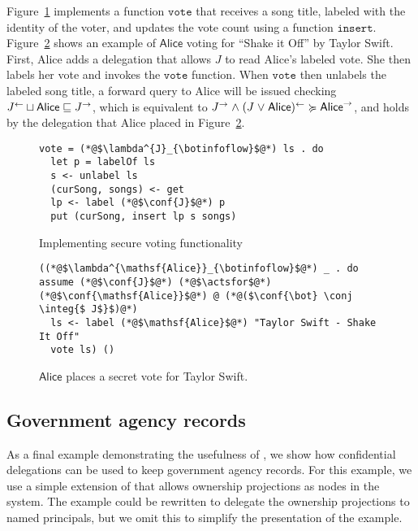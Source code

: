 Figure~\ref{fig:vote-for-song} implements a function $\mathtt{vote}$ that receives a song title, labeled with the identity of the voter, and updates the vote count using a function $\mathtt{insert}$. Figure~\ref{fig:jukebox-alice-votes-for-taylor-swift} shows an example of $\mathsf{Alice}$ voting for ``Shake it Off'' by Taylor Swift. First, Alice adds a delegation that allows $J$ to read Alice's labeled vote. She then labels her vote and invokes the $\mathtt{vote}$ function. When $\mathtt{vote}$ then unlabels the labeled song title, a forward query to Alice will be issued checking $J^{\leftarrow} \sqcup \mathsf{Alice} \sqsubseteq J^{\rightarrow}$, which is equivalent to $J^{\rightarrow} \mathrel{\land} (J \mathrel{\lor} \mathsf{Alice})^{\leftarrow} \succcurlyeq \mathsf{Alice}^{\rightarrow}$, and holds by the delegation that Alice placed in Figure~\ref{fig:jukebox-alice-votes-for-taylor-swift}.

\begin{figure}
\centering
\begin{lstlisting}
vote = (*@$\lambda^{J}_{\botinfoflow}$@*) ls . do
  let p = labelOf ls
  s <- unlabel ls
  (curSong, songs) <- get
  lp <- label (*@$\conf{J}$@*) p
  put (curSong, insert lp s songs)
\end{lstlisting}
\caption{Implementing secure voting functionality}
\label{fig:vote-for-song}
\end{figure}

\begin{figure}
\centering
\begin{lstlisting}
((*@$\lambda^{\mathsf{Alice}}_{\botinfoflow}$@*) _ . do assume (*@$\conf{J}$@*) (*@$\actsfor$@*) (*@$\conf{\mathsf{Alice}}$@*) @ (*@($\conf{\bot} \conj \integ{$ J$}$)@*)
  ls <- label (*@$\mathsf{Alice}$@*) "Taylor Swift - Shake It Off"
  vote ls) ()
\end{lstlisting}
\caption{$\mathsf{Alice}$ places a secret vote for Taylor Swift.}
\label{fig:jukebox-alice-votes-for-taylor-swift}
\end{figure}

\subsection{Government agency records}\label{subsec:agents}
As a final example demonstrating the usefulness of \lang, we show how confidential delegations can be used to keep government agency records. For this example, we use a simple extension of \lang{} that allows ownership projections as nodes in the system. The example could be rewritten to delegate the ownership projections to named principals, but we omit this to simplify the presentation of the example.

